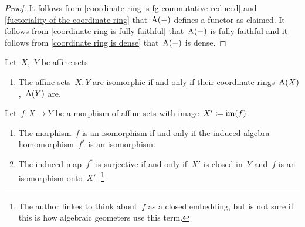 \begin{proof}
  It follows from \cref{coordinate ring is fg commutative reduced} and \cref{fuctoriality of the coordinate ring} that~$\operatorname{A}(-)$ defines a functor as claimed.
  It follows from \cref{coordinate ring is fully faithful} that~$\operatorname{A}(-)$ is fully faithful and it follows from \cref{coordinate ring is dense} that~$\operatorname{A}(-)$ is dense.
\end{proof}


\begin{corollary}
  \label{induced is isomorphism or surjective}
  Let~$X$,~$Y$ be affine sets
  \begin{enumerate}
    \item
      \label{affine sets isomorphic iff coordinate rings isomorphic}
      The affine sets~$X, Y$ are isomorphic if and only if their coordinate rings~$\operatorname{A}(X)$,~$\operatorname{A}(Y)$ are.
  \end{enumerate}
  Let~$f \colon X \to Y$ be a morphism of affine sets with image~$X' \coloneqq \operatorname{im}(f)$.
  \begin{enumerate}[resume]
    \item
      \label{isomorphism iff induced isomorphism}
      The morphism~$f$ is an isomorphism if and only if the induced algebra homomorphism~$f^*$ is an isomorphism.
    \item
      \label{induced surjective iff closed embedding}
      The induced map~$f^*$ is surjective if and only if~$X'$ is closed in~$Y$ and~$f$ is an isomorphism onto~$X'$.%
      \footnote{The author linkes to think about~$f$ as a closed embedding, but is not sure if this is how algebraic geometers use this term.}
  \end{enumerate}
\end{corollary}


